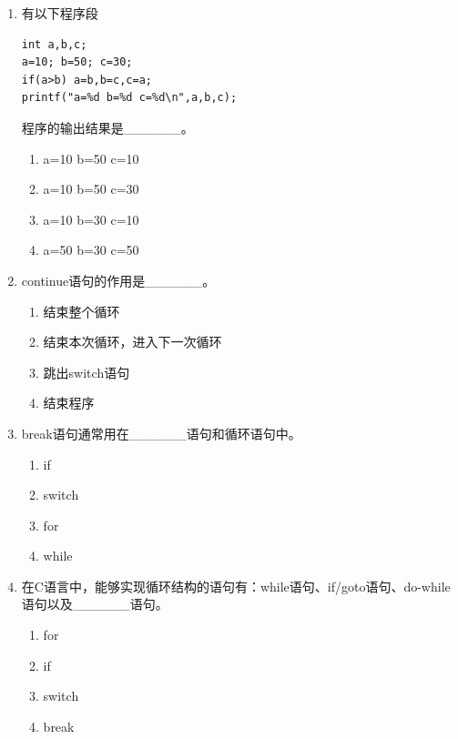 \documentclass[a4paper,12pt]{article}
\begin{document}
\begin{enumerate}
	\item 有以下程序段
	      \begin{verbatim}
int a,b,c;
a=10; b=50; c=30;
if(a>b) a=b,b=c,c=a;
printf("a=%d b=%d c=%d\n",a,b,c);
    \end{verbatim}
	      程序的输出结果是\_\_\_\_\_\_。
	      \begin{enumerate}
		      \item[A)] a=10 b=50 c=10
		      \item[B)] a=10 b=50 c=30
		      \item[C)] a=10 b=30 c=10
		      \item[D)] a=50 b=30 c=50
	      \end{enumerate}
	      \vspace{0.3cm}

	\item continue语句的作用是\_\_\_\_\_\_。
	      \begin{enumerate}
		      \item[A)] 结束整个循环
		      \item[B)] 结束本次循环，进入下一次循环
		      \item[C)] 跳出switch语句
		      \item[D)] 结束程序
	      \end{enumerate}
	      \vspace{0.3cm}

	\item break语句通常用在\_\_\_\_\_\_语句和循环语句中。
	      \begin{enumerate}
		      \item[A)] if
		      \item[B)] switch
		      \item[C)] for
		      \item[D)] while
	      \end{enumerate}
	      \vspace{0.3cm}

	\item 在C语言中，能够实现循环结构的语句有：while语句、if/goto语句、do-while语句以及\_\_\_\_\_\_语句。
	      \begin{enumerate}
		      \item[A)] for
		      \item[B)] if
		      \item[C)] switch
		      \item[D)] break
	      \end{enumerate}
	      \vspace{0.3cm}


\end{enumerate}
\end{document}
